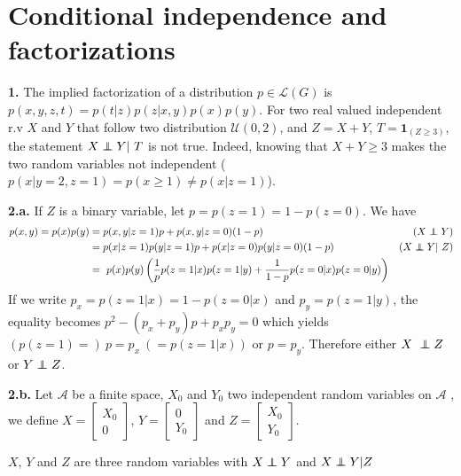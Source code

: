\documentclass[12pt, oneside]{amsart}   	%
\title{}
\author{}
\date{}							%
\newcommand\indep{\protect\mathpalette{\protect\indeP}{\perp}}
\def\indeP#1#2{\mathrel{\rlap{$#1#2$}\mkern2mu{#1#2}}}
\begin{document}
\section{Conditional independence and factorizations}
\textbf{1.}  The implied factorization of a distribution $p\in \mathcal{L}(G)$ is $p(x, y, z, t) = p(t|z)p(z|x, y)p(x)p(y)$. For two real valued independent r.v $X$ and $Y$ that follow two distribution $\mathcal{U}(0, 2)$, and $Z = X+Y$, $T = \mathbf{1}_{(Z \geq 3)}$, the statement $X\indep Y | T$ is not true.
Indeed, knowing that $X+Y \geq 3$ makes the two random variables not independent ($p(x| y=2, z=1) = p(x \geq 1) \neq p(x|z=1)$).
\vspace{0.5cm}
 
 \textbf{2.a.} If $Z$ is a binary variable, let $p = p(z=1) = 1 - p(z=0)$. We have 
 \begin{align*}
 	p(x, y) = p(x)p(y) &= p(x, y|z=1)p + p(x, y|z=0)(1-p) & (X\indep Y ) \\
	& = p(x|z=1)p(y|z=1)p + p(x|z=0)p(y|z=0)(1-p) & (X\indep Y | Z)\\
	&  = p(x)p(y)\left(\frac{1}{p} p(z=1|x)p(z=1|y) + \frac{1}{1-p}p(z=0|x)p(z=0|y)\right)
 \end{align*}
 If we write $p_x = p(z=1|x) = 1-p(z=0|x)$ and $p_y = p(z=1|y)$, the equality becomes $p^2 - (p_x + p_y)p + p_xp_y
 = 0$ which yields $ \left(p(z=1) = \right)\ p = p_x\ ( =  p(z=1|x) )$ or $p = p_y$. Therefore either $X \indep Z$ or $Y \indep Z$.
\vspace{0.5cm}
 
 \textbf{2.b.} Let $\mathcal{A}$ be a finite space, $X_0$ and $Y_0$ two independent random variables on $\mathcal{A}$ , 
 we define $X =\begin{bmatrix} X_0 \\ 0 \end{bmatrix}$, $Y = \begin{bmatrix} 0 \\ Y_0 \end{bmatrix}$ and $Z = \begin{bmatrix} X_0 \\ Y_0 \end{bmatrix}$. 
 
 $X$, $Y$ and $Z$ are three random variables with $X \indep Y$ and $ X \indep Y | Z$
 
 
\end{document}
